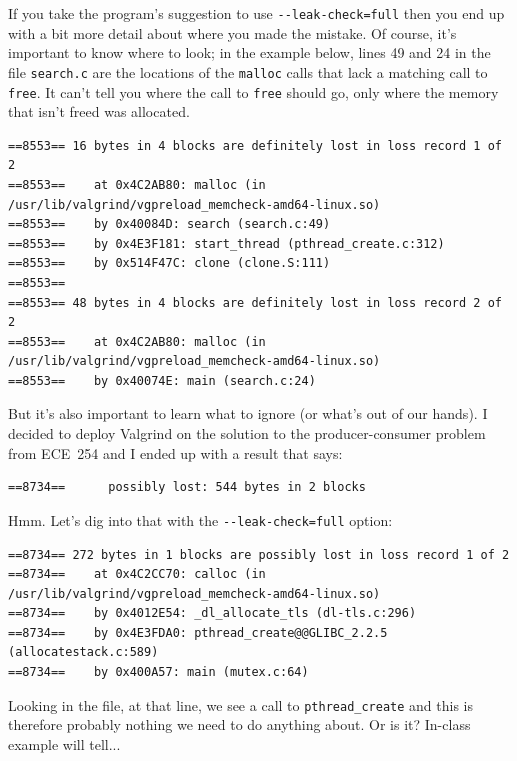 \documentclass[a4paper]{report}
\begin{document}
If you take the program's suggestion to use \verb+--leak-check=full+ then you end up with a bit more detail about where you made the mistake. Of course, it's important to know where to look; in the example below, lines 49 and 24 in the file \texttt{search.c} are the locations of the \texttt{malloc} calls that lack a matching call to \texttt{free}. It can't tell you where the call to \texttt{free} should go, only where the memory that isn't freed was allocated.

\begin{lstlisting}
==8553== 16 bytes in 4 blocks are definitely lost in loss record 1 of 2
==8553==    at 0x4C2AB80: malloc (in /usr/lib/valgrind/vgpreload_memcheck-amd64-linux.so)
==8553==    by 0x40084D: search (search.c:49)
==8553==    by 0x4E3F181: start_thread (pthread_create.c:312)
==8553==    by 0x514F47C: clone (clone.S:111)
==8553== 
==8553== 48 bytes in 4 blocks are definitely lost in loss record 2 of 2
==8553==    at 0x4C2AB80: malloc (in /usr/lib/valgrind/vgpreload_memcheck-amd64-linux.so)
==8553==    by 0x40074E: main (search.c:24)

\end{lstlisting}

But it's also important to learn what to ignore (or what's out of our hands). I decided to deploy Valgrind on the solution to the producer-consumer problem from ECE~254 and I ended up with a result that says:

\begin{lstlisting}
==8734==      possibly lost: 544 bytes in 2 blocks
\end{lstlisting}

Hmm. Let's dig into that with the \verb+--leak-check=full+ option:

\begin{lstlisting}
==8734== 272 bytes in 1 blocks are possibly lost in loss record 1 of 2
==8734==    at 0x4C2CC70: calloc (in /usr/lib/valgrind/vgpreload_memcheck-amd64-linux.so)
==8734==    by 0x4012E54: _dl_allocate_tls (dl-tls.c:296)
==8734==    by 0x4E3FDA0: pthread_create@@GLIBC_2.2.5 (allocatestack.c:589)
==8734==    by 0x400A57: main (mutex.c:64)
\end{lstlisting}

Looking in the file, at that line, we see a call to \texttt{pthread\_create} and this is therefore probably nothing we need to do anything about. Or is it? In-class example will tell...
\end{document}
